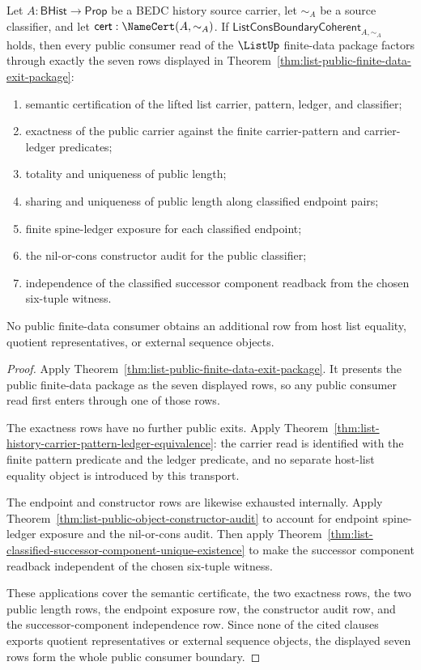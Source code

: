 \begin{theorem}
\label{thm:list-finite-data-consumer-row-exhaustion}
Let $A:\mathsf{BHist}\to\mathsf{Prop}$ be a BEDC history source carrier, let
$\sim_A$ be a source classifier, and let
$\mathsf{cert}:\NameCert(A,\sim_A)$. If
$\mathsf{ListConsBoundaryCoherent}_{A,\sim_A}$ holds, then every public
consumer read of the $\ListUp$ finite-data package factors through exactly the
seven rows displayed in
Theorem~\ref{thm:list-public-finite-data-exit-package}:
\begin{enumerate}
  \item semantic certification of the lifted list carrier, pattern, ledger, and
  classifier;
  \item exactness of the public carrier against the finite carrier-pattern and
  carrier-ledger predicates;
  \item totality and uniqueness of public length;
  \item sharing and uniqueness of public length along classified endpoint
  pairs;
  \item finite spine-ledger exposure for each classified endpoint;
  \item the nil-or-cons constructor audit for the public classifier;
  \item independence of the classified successor component readback from the
  chosen six-tuple witness.
\end{enumerate}
No public finite-data consumer obtains an additional row from host list
equality, quotient representatives, or external sequence objects.
\end{theorem}
\begin{proof}
Apply Theorem~\ref{thm:list-public-finite-data-exit-package}. It presents the
public finite-data package as the seven displayed rows, so any public consumer
read first enters through one of those rows.

The exactness rows have no further public exits. Apply
Theorem~\ref{thm:list-history-carrier-pattern-ledger-equivalence}: the carrier
read is identified with the finite pattern predicate and the ledger predicate,
and no separate host-list equality object is introduced by this transport.

The endpoint and constructor rows are likewise exhausted internally. Apply
Theorem~\ref{thm:list-public-object-constructor-audit} to account for endpoint
spine-ledger exposure and the nil-or-cons audit. Then apply
Theorem~\ref{thm:list-classified-successor-component-unique-existence} to make
the successor component readback independent of the chosen six-tuple witness.

These applications cover the semantic certificate, the two exactness rows, the
two public length rows, the endpoint exposure row, the constructor audit row,
and the successor-component independence row. Since none of the cited clauses
exports quotient representatives or external sequence objects, the displayed
seven rows form the whole public consumer boundary.
\end{proof}

